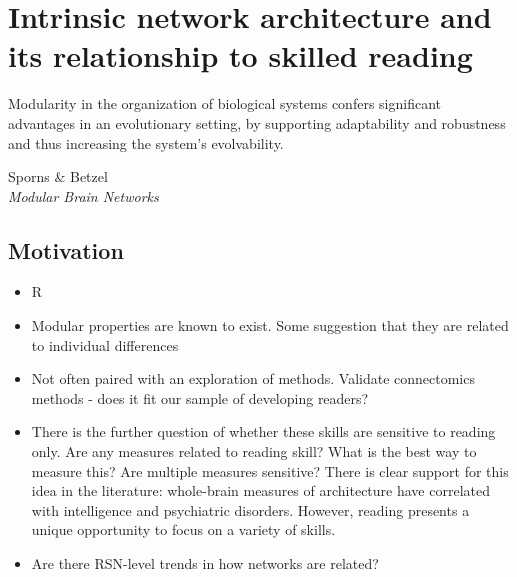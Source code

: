 \chapter{Intrinsic network architecture and its relationship to skilled reading}

\epigraph{Modularity in the organization of biological systems confers significant advantages in an evolutionary setting, by supporting adaptability and robustness and thus increasing the system's evolvability.}{Sporns \& Betzel\\\textit{Modular Brain Networks}}

\section{Motivation}

\begin{itemize}
    \item R
    \item Modular properties are known to exist. Some suggestion that they are related to individual differences 
    \item Not often paired with an exploration of methods. Validate connectomics methods - does it fit our sample of developing readers?
    \item There is the further question of whether these skills are sensitive to reading only. Are any measures related to reading skill? What is the best way to measure this? Are multiple measures sensitive? There is clear support for this idea in the literature: whole-brain measures of architecture have correlated with intelligence and psychiatric disorders. However, reading presents a unique opportunity to focus on a variety of skills.
    \item Are there RSN-level trends in how networks are related?
\end{itemize}


